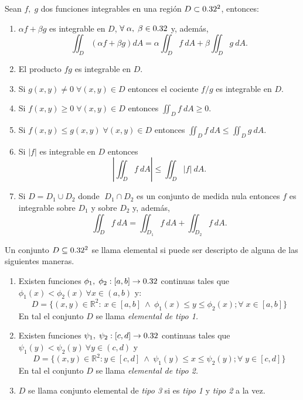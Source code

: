 \begin{propertie}
    Sean $f,\;g$ dos funciones integrables en una regi\'on $D\subset0.32^2$, entonces:
    \begin{enumerate}
        \item[i.] $\alpha f+\beta g$ es integrable en $D$, $\forall\;\alpha,\;\beta\in0.32$ y, adem\'as,
        \[
            \iint_D \left(\alpha f+\beta g\right)dA=\alpha\iint_D f\:dA+\beta\iint_D g\:dA.
        \]
        \item[ii.] El producto $fg$ es integrable en $D$.
        \item[iii.] Si $g(x,y) \neq 0\;\forall(x,y)\in D$ entonces el cociente $f/g$ es integrable en $D$.
        \item[iv.] Si $f(x,y)\geq 0 \;\forall(x,y)\in D$ entonces  $\iint_D f\:dA\geq0$.
        \item[v.]Si $f(x,y)\leq g(x,y)  \;\forall(x,y)\in D$ entonces $\iint_D f\:dA\leq\iint_D g\:dA.$
        \item[vi.]Si $|f|$ es integrable en $D$ entonces 
        \[
            \left|\iint_D f\:dA\right|\leq\iint_D|f|\:dA.  
        \]    
        \item[vii.] Si $D=D_1\cup D_2$ donde $\;D_1\cap D_2$ es un conjunto de medida nula  entonces   $f$ es integrable sobre $D_1$ y sobre $D_2$ y, adem\'as,  
        \[
            \iint_D f\:dA=\iint_{D_1} f\:dA+\iint_{D_2}f\:dA.    
        \]
    \end{enumerate}
\end{propertie}

\begin{definition}\label{conj_elem}  Un conjunto  $D\subseteq0.32^2$ se llama elemental si  puede ser descripto de alguna de las siguientes maneras. 
   
    \begin{enumerate}
    \item[i.]  Existen funciones $\phi_1,\;\phi_2:[a,b]\to0.32$  continuas  tales que $ \phi_1(x) < \phi_2(x) \: \forall x \in (a,b) $  y:
    \[
     D = \{ (x,y) \in \mathbb{R}^{2}: \:   x\in[a,b] \: \land \: \phi_1(x)\leq y\leq\phi_2(x) ;\forall\;x\in[a,b] \}  
    \]   En tal  el conjunto $D$ se llama  \textit{elemental de tipo 1.} 
   
    \item[ii.]  Existen funciones $\psi_1,\;\psi_2:[c,d]\to0.32$  continuas tales que $ \psi_1(y) < \psi_2(y) \: \forall y \in (c,d)$ y 
    \[
     D = \{ (x,y) \in \mathbb{R}^{2}:   y\in[c,d] \: \land \:  \psi_1(y)\leq x\leq\psi_2(y) ;\forall\;y\in[c,d] \}  
    \]
     En tal  el conjunto $D$  se llama  \textit{elemental de tipo 2.} 
    
    \item[iii.] $D$ se llama conjunto elemental de \textit{tipo 3} si es \textit{tipo 1} y \textit{tipo 2} a la vez.
    
    
    
    \end{enumerate}
\end{definition}

